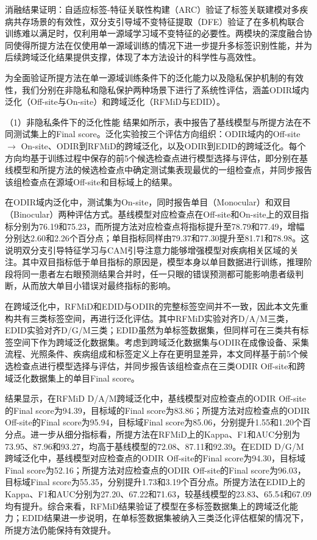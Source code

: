消融结果证明：自适应标签-特征关联性构建（ARC）验证了标签关联建模对多疾病共存场景的有效性，双分支引导域不变特征提取（DFE）验证了在多机构联合训练难以满足时，仅利用单一源域学习域不变特征的必要性。两模块的深度融合协同使得所提方法在仅使用单一源域训练的情况下进一步提升多标签识别性能，并为后续跨域泛化结果提供支撑，体现了本方法设计的科学性与高效性。


为全面验证所提方法在单一源域训练条件下的泛化能力以及隐私保护机制的有效性，我们分别在非隐私和隐私保护两种场景下进行了系统性评估，涵盖ODIR域内泛化（Off-site与On-site）和跨域泛化（RFMiD与EDID）。



（1）非隐私条件下的泛化性能 结果如所示，表中报告了基线模型与所提方法在不同测试集上的Final score。泛化实验按三个评估方向组织：ODIR域内的Off-site \(\rightarrow\) On-site、ODIR到RFMiD的跨域泛化，以及ODIR到EDID的跨域泛化。每个方向均基于训练过程中保存的前5个候选检查点进行模型选择与评估，即分别在基线模型和所提方法的候选检查点中确定测试集表现最优的一组检查点，并同步报告该组检查点在源域Off-site和目标域上的结果。



在ODIR域内泛化中，测试集为On-site，同时报告单目（Monocular）和双目（Binocular）两种评估方式。基线模型对应检查点在Off-site和On-site上的双目指标分别为76.19和75.23，而所提方法对应检查点将指标提升至78.79和77.49，增幅分别达2.60和2.26个百分点；单目指标同样由79.37和77.30提升至81.71和78.98。这说明双分支引导特征学习与CAM引导注意力能够增强模型对疾病相关区域的关注。其中双目指标低于单目指标的原因是，模型本身以单目数据进行训练，推理阶段将同一患者左右眼预测结果合并时，任一只眼的错误预测都可能影响患者级判断，从而放大单目小错误对最终指标的影响。

在跨域泛化中，RFMiD和EDID与ODIR的完整标签空间并不一致，因此本文先重构共有三类标签空间，再进行泛化评估。其中RFMiD实验对齐D/A/M三类，EDID实验对齐D/G/M三类；EDID虽然为单标签数据集，但同样可在三类共有标签空间下作为跨域泛化数据集。考虑到跨域泛化数据集与ODIR在成像设备、采集流程、光照条件、疾病组成和标签定义上存在更明显差异，本文同样基于前5个候选检查点进行模型选择与评估，并同步报告该组检查点在三类ODIR Off-site和跨域泛化数据集上的单目Final score。

结果显示，在RFMiD D/A/M跨域泛化中，基线模型对应检查点的ODIR Off-site的Final score为94.39，目标域的Final score为83.86；所提方法对应检查点的ODIR Off-site的Final score为95.94，目标域Final score为85.06，分别提升1.55和1.20个百分点。进一步从细分指标看，所提方法在RFMiD上的Kappa、F1和AUC分别为73.95、87.96和93.27，均高于基线模型的72.08、87.11和92.39。在EDID D/G/M跨域泛化中，基线模型对应检查点的ODIR Off-site的Final score为94.30，目标域Final score为52.16；所提方法对应检查点的ODIR Off-site的Final score为96.03，目标域Final score为55.35，分别提升1.73和3.19个百分点。所提方法在EDID上的Kappa、F1和AUC分别为27.20、67.22和71.63，较基线模型的23.83、65.54和67.09均有提升。综合来看，RFMiD结果验证了模型在多标签数据集上的跨域泛化能力；EDID结果进一步说明，在单标签数据集被纳入三类泛化评估框架的情况下，所提方法仍能保持有效提升。

